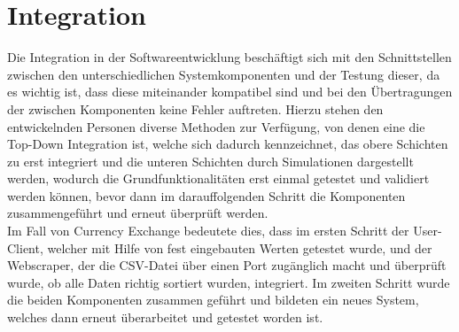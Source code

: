\documentclass[conference]{IEEEtran}
\begin{document}
\section{Integration}
Die Integration in der Softwareentwicklung beschäftigt sich mit den Schnittstellen zwischen den unterschiedlichen Systemkomponenten und der Testung dieser, da es wichtig ist, dass diese miteinander kompatibel sind und bei den Übertragungen der zwischen Komponenten keine Fehler auftreten. Hierzu stehen den entwickelnden Personen diverse Methoden zur Verfügung, von denen eine die Top-Down Integration ist, welche sich dadurch kennzeichnet, das obere Schichten zu erst integriert und die unteren Schichten durch Simulationen dargestellt werden, wodurch die Grundfunktionalitäten erst einmal getestet und validiert werden können, bevor dann im darauffolgenden Schritt die Komponenten zusammengeführt und erneut überprüft werden.\\
Im Fall von Currency Exchange bedeutete dies, dass im ersten Schritt der User-Client, welcher mit Hilfe von fest eingebauten Werten getestet wurde, und der Webscraper, der die CSV-Datei über einen Port zugänglich macht und überprüft wurde, ob alle Daten richtig sortiert wurden, integriert. Im zweiten Schritt wurde die beiden Komponenten zusammen geführt und bildeten ein neues System, welches dann erneut überarbeitet und getestet worden ist. 
\end{document}
